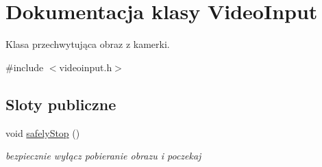 \hypertarget{class_video_input}{
\section{Dokumentacja klasy VideoInput}
\label{class_video_input}
}


Klasa przechwytująca obraz z kamerki.  




{\ttfamily \#include $<$videoinput.h$>$}

\subsection*{Sloty publiczne}
\begin{DoxyCompactItemize}
\item 
\hypertarget{class_video_input_a78e2d773100160be101d3c48ecdfb910}{
void \hyperlink{class_video_input_a78e2d773100160be101d3c48ecdfb910}{safelyStop} ()}
\label{class_video_input_a78e2d773100160be101d3c48ecdfb910}

\begin{DoxyCompactList}\small\item\em bezpiecznie wyłącz pobieranie obrazu i poczekaj \item\end{DoxyCompactList}\end{DoxyCompactItemize}
